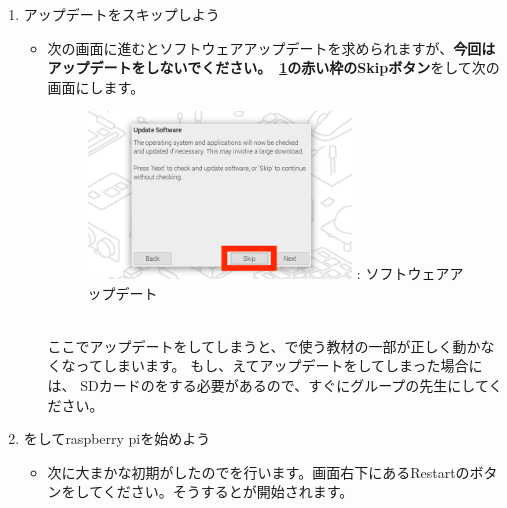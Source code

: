\documentclass[a4paper,12pt]{jarticle}
\begin{document}
\begin{enumerate}
\begin{itemize}
                \end{itemize}  
   \clearpage           
    \item
        アップデートをスキップしよう
                \begin{itemize}
                  \item
                      次の画面に進むとソフトウェアアップデートを求められますが、\textbf{今回はアップデートをしないでください。~\ref{seq:refFigure18}の}\textbf{\color{red}赤い枠のSkipボタン}をして次の画面にします。
                      \begin{figure}[h]
                        \centering
                        \begin{minipage}{5.228cm}
                          {\upshape
                            \includegraphics[width=7.000cm]{sw_image07.png}
                            \newline
                            {\theFigure\label{seq:refFigure18}}:
                            ソフトウェアアップデート}
                        \end{minipage}
                      \end{figure}
                      \\ここでアップデートをしてしまうと、で使う教材の一部が正しく動かなくなってしまいます。
                      もし、えてアップデートをしてしまった場合には、
                      SDカードのをする必要があるので、すぐにグループの先生にしてください。
                      \bigskip
                  \end{itemize}  
    \item
        をしてraspberry piを始めよう
                \begin{itemize}
                  \item
                        次に大まかな初期がしたのでを行います。画面右下にあるRestartのボタンをしてください。そうするとが開始されます。

\end{itemize}
\end{enumerate}
\end{document}
